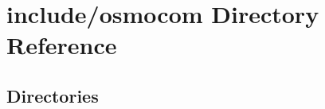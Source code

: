 \section{include/osmocom Directory Reference}
\label{dir_abe9b486a10ccc5afdf8abc29637e0c1}
\subsection*{Directories}
\begin{DoxyCompactItemize}
\end{DoxyCompactItemize}
